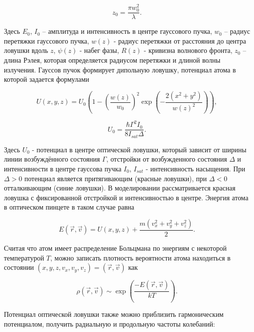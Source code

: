 \begin{equation}
	z_0=\frac{\pi w_0^2}{\lambda}.
\end{equation}

Здесь $E_0$, $I_0$ – амплитуда и интенсивность в центре гауссового пучка, $w_0$ – радиус перетяжки гауссового пучка, $w\left(z\right)$ - радиус перетяжки от расстояния до центра ловушки вдоль $z$, $\psi\left(z\right)$ - набег фазы, $R\left(z\right)$ - кривизна волнового фронта, $z_0$ – длина Рэлея, которая определяется радиусом перетяжки и длиной волны излучения. Гауссов пучок формирует дипольную ловушку, потенциал атома в которой задается формулами \cite{grimm1999optical}

\begin{equation}
	U\left(x,y,z\right)=U_0\left(1-\left(\frac{w\left(z\right)}{w_0}\right)^2\exp{\left(-\frac{2\left(x^2+y^2\right)}{w\left(z\right)^2}\right)}\right),	
\end{equation}

\begin{equation}
	U_0 = \frac{\hbar \Gamma^2 I_0}{8 I_{sat}\Delta}.
\end{equation}

Здесь $U_0$ - потенциал в центре оптической ловушки, который зависит от ширины линии возбуждённого состояния $\Gamma$, отстройки от возбужденного состояния $\Delta$ и интенсивности в центре гауссова пучка $I_0$, $I_{sat}$ - интенсивность насыщения. При $\Delta > 0$ потенциал является притягивающим (красные ловушки), при $\Delta < 0$ отталкивающим (синие ловушки). В моделировании рассматривается красная ловушка с фиксированной отстройкой и интенсивностью в центре. Энергия атома в оптическом пинцете в таком случае равна 

\begin{equation}
	E\left(\vec{r},\vec{v}\right)=U\left(x,y,z\right)+\frac{m\left(v_x^2+v_y^2+v_z^2\right)}{2}.
\end{equation}	 

Считая что атом имеет распределение Больцмана по энергиям с некоторой температурой $T$, можно записать плотность вероятности атома находиться в состоянии $(x,y,z,v_x,v_y,v_z) = (\vec{r},\vec{v})$ как 

\begin{equation}
	\rho\left(\vec{r},\vec{v}\right)\sim \exp{\left(\frac{-E\left(\vec{r},\vec{v}\right)}{kT}\right)}.
\end{equation}

Потенциал оптической ловушки также можно приблизить гармоническим потенциалом, получить радиальную и продольную частоты колебаний:

